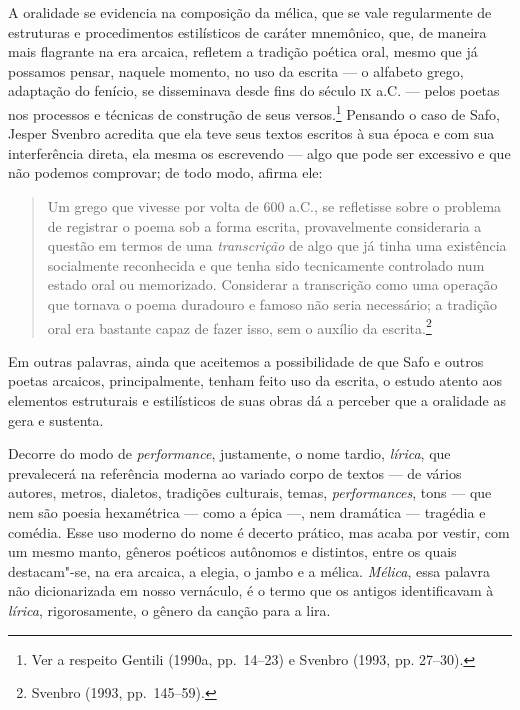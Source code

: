 A oralidade se evidencia na composição da mélica, que se vale regularmente de
estruturas e procedimentos estilísticos de caráter mnemônico, que,
de maneira mais flagrante na era arcaica, refletem a tradição poética oral,
mesmo que já possamos pensar, naquele momento, no uso da escrita --- o alfabeto
grego, adaptação do fenício, se disseminava desde fins do século \textsc{ix} a.C. ---
pelos poetas nos processos e técnicas de construção de seus
versos.\footnote{ Ver a respeito Gentili (1990a, pp.~14--23) e Svenbro (1993, pp.
27--30).} Pensando o caso de Safo, Jesper Svenbro acredita
que ela teve seus textos escritos à sua época e com sua interferência direta,
ela mesma os escrevendo --- algo que pode ser excessivo e que não podemos
comprovar; de todo modo, afirma ele:

\begin{quote}
Um grego que vivesse por volta de 600 a.C., se refletisse sobre o problema de
registrar o poema sob a forma escrita, provavelmente consideraria a questão em
termos de uma \textit{transcrição} de algo que já tinha uma existência
socialmente reconhecida e que tenha sido tecnicamente controlado num estado
oral ou memorizado. Considerar a transcrição como uma operação que tornava o
poema duradouro e famoso não seria necessário; a tradição oral era bastante
capaz de fazer isso, sem o auxílio da escrita.\footnote{ Svenbro (1993, pp.~145--59).}
\end{quote}

Em outras palavras, ainda que aceitemos a possibilidade de que Safo e outros
poetas arcaicos, principalmente, tenham feito uso da escrita, o estudo atento
aos elementos estruturais e estilísticos de suas obras dá a perceber que a oralidade as gera e sustenta.

Decorre do modo de \textit{performance}, justamente, o nome tardio,
\textit{lírica}, que prevalecerá na referência moderna ao variado corpo de
textos --- de vários autores, metros, dialetos, tradições culturais, temas,
\textit{performances}, tons --- que nem são poesia hexamétrica --- como a
épica ---, nem dramática --- tragédia e comédia. Esse uso moderno do nome é decerto
prático, mas acaba por vestir, com um mesmo manto,
gêneros poéticos autônomos e distintos, entre os quais destacam"-se, na era
arcaica, a elegia, o jambo e a mélica. \textit{Mélica}, essa palavra não
dicionarizada em nosso vernáculo, é o termo que os antigos identificavam à
\textit{lírica}, rigorosamente, o gênero da canção para a lira. 

